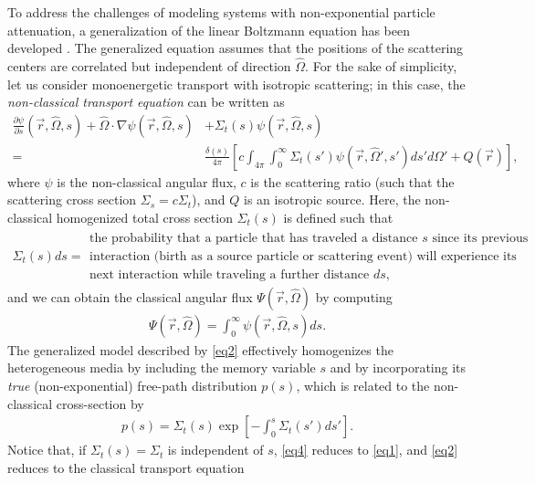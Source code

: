 \documentclass[12pt]{article}
\newcommand{\rvec}{\ensuremath{\vec{r}}}
\newcommand{\omvec}{\ensuremath{\hat{\Omega}}}
\begin{document}
To address the challenges of modeling systems with non-exponential particle attenuation, a generalization of the linear Boltzmann equation has been developed \cite{larvas11,davxu14,vaslar14a,xudav16}.
The generalized equation assumes that the positions of the scattering centers are correlated but independent of direction $\omvec$.
For the sake of simplicity, let us consider monoenergetic transport with isotropic scattering; in this case, the \textit{non-classical transport equation} can be written as
\begin{align}
\frac{\partial \psi}{\partial s}(\rvec,\omvec,s) + \omvec\cdot\nabla\psi(\rvec,\omvec,s) &+ \Sigma_t(s)\psi(\rvec,\omvec,s)\label{eq2} \\
=
&\frac{\delta(s)}{4\pi}\left[c\int_{4\pi}\int_0^\infty \Sigma_t(s')\psi(\rvec,\omvec',s')ds'd\Omega' + Q(\rvec)\right],\nonumber
\end{align}
where $\psi$ is the non-classical angular flux, $c$ is the scattering ratio (such that the scattering cross section $\Sigma_s = c\Sigma_t$), and $Q$ is an isotropic source.
Here, the non-classical homogenized total cross section $\Sigma_t(s)$ is defined such that
\begin{align*}
\Sigma_t(s)ds =
\begin{array}{l}
\text{the probability that a particle that has traveled
a distance $s$ since its previous}\\
\text{interaction (birth as a source particle or scattering event) will experience its}\\
\text{next interaction while
traveling a further distance $ds$,}
\end{array}
\end{align*}
and we can obtain the classical angular flux $\Psi(\rvec,\omvec)$ by computing
\begin{align}
\Psi(\rvec,\omvec) = \int_0^\infty \psi(\rvec,\omvec,s)ds.
\end{align}
The generalized model described by \cref{eq2} effectively homogenizes the heterogeneous media by including the memory variable $s$ and by incorporating its \textit{true} (non-exponential) free-path distribution $p(s)$, which is related to the non-classical cross-section by \cite{larvas11}
\begin{align}\label{eq4}
p(s) = \Sigma_t(s)\exp\left[-\int_0^s\Sigma_t(s')ds'\right].
\end{align}
Notice that, if $\Sigma_t(s)=\Sigma_t$ is independent of $s$, \cref{eq4} reduces to \cref{eq1}, and \cref{eq2} reduces to the classical transport equation
\end{document}
